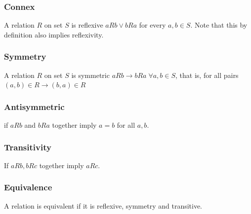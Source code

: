 \documentclass[a4paper]{article}
\theoremstyle{plain}
\theoremstyle{definition}
\newtheorem{defn}{Definition}[section]
\theoremstyle{remark}
\begin{document}
\subsubsection{Connex}
\begin{tcolorbox}[colback=black!3!white,colframe=black!60!white,title=\begin{defn}Connex \label{Connex}\end{defn}]
A relation $R$ on set $S$ is reflexive $aRb \lor bRa$ for every $a,b \in S$. Note that this by definition also implies reflexivity.
\end{tcolorbox}
\subsubsection{Symmetry}
\begin{tcolorbox}[colback=black!3!white,colframe=black!60!white,title=\begin{defn}Symmetry \label{Symmetry}\end{defn}]

A relation $R$ on set $S$ is symmetric $aRb \to bRa \; \forall a,b \in S$, that is, for all pairs $(a,b) \in R \to (b,a) \in R$
\end{tcolorbox}
\subsubsection{Antisymmetric}
\begin{tcolorbox}[colback=black!3!white,colframe=black!60!white,title=\begin{defn}Antisymmetric \label{Antisymmetric}\end{defn}]
if $aRb$ and $bRa$ together imply $a=b$ for all $a,b$. 
\end{tcolorbox}
\subsubsection{Transitivity}
\begin{tcolorbox}[colback=black!3!white,colframe=black!60!white,title=\begin{defn}Transitivity \label{Transitivity}\end{defn}]
If $aRb,bRc$ together imply $aRc$.
\end{tcolorbox}
\subsubsection{Equivalence}
\begin{tcolorbox}[colback=black!3!white,colframe=black!60!white,title=\begin{defn}Equivalence \label{Equivalence}\end{defn}]
A relation is equivalent if it is reflexive, symmetry and transitive.
\end{tcolorbox}
\end{document}
